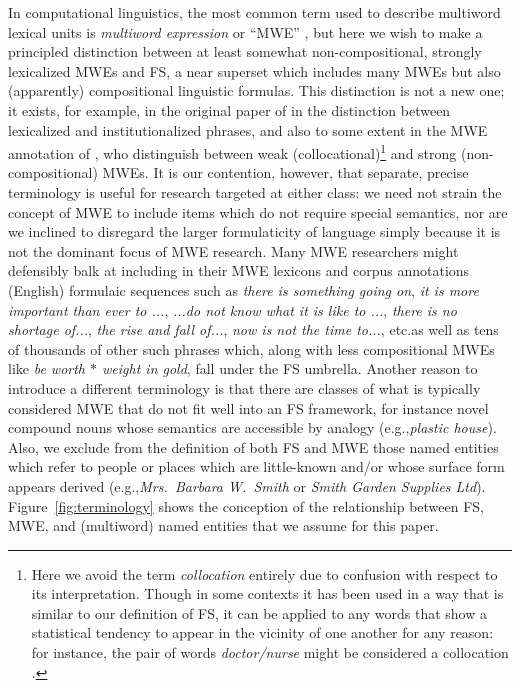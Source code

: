 \documentclass[11pt,letterpaper]{article}
\makeatletter
\def \eg {e.g.,\@ }
\def \etc {etc.\@ }
\newcommand{\dotts}{...}
\newcommand{\gap}{$*$\xspace}
\newcommand{\ex}[1]{\textit{#1}\xspace}
\newcommand{\figref}[2][]{Figure#1~\ref{#2}\xspace}
\makeatother
\begin{document}
In computational linguistics, the most common term used to describe multiword lexical units is \emph{multiword expression} or ``MWE'' \cite{Sag02,Baldwin10}, but here we wish to make a principled distinction between at least somewhat non-compositional, strongly lexicalized MWEs and FS, a near superset which includes many MWEs but also (apparently) compositional linguistic formulas. This distinction is not a new one; it exists, for example, in the original paper of  in the distinction between lexicalized and institutionalized phrases, and also to some extent in the MWE annotation of , who distinguish between weak (collocational)\footnote{Here we avoid the term \emph{collocation} entirely due to confusion with respect to its interpretation. Though in some contexts it has been used in a way that is similar to our definition of FS, it can be applied to any words that show a statistical tendency to appear in the vicinity of one another for any reason: for instance, the pair of words \ex{doctor/nurse} might be considered a collocation \cite{Ramisch14}.}  and strong (non-compositional) MWEs. It is our contention, however, that separate, precise terminology is useful for research targeted at either class: we need not strain the concept of MWE to include items which do not require special semantics, nor are we inclined to disregard the larger formulaticity of language simply because it is not the dominant focus of MWE research. Many MWE researchers might defensibly balk at including in their MWE lexicons and corpus annotations (English) formulaic sequences such as \ex{there is something going on}, \ex{it is more important than ever to \dotts}, \ex{\dotts do not know what it is like to \dotts}, \ex{there is no shortage of\dotts}, \ex{the rise and fall of\dotts}, \ex{now is not the time to\dotts}, \etc as well as tens of thousands of other such phrases which, along with less compositional MWEs like \ex{be worth \gap weight in gold}, fall under the FS umbrella. Another reason to introduce a different terminology is that there are classes of what is typically considered MWE that do not fit well into an FS framework, for instance novel compound nouns whose semantics are accessible by analogy (\eg \ex{plastic house}). Also, we exclude from the definition of both FS and MWE those named entities which refer to people or places which are little-known and/or whose surface form appears derived (\eg \ex{Mrs.\ Barbara W.\ Smith} or \ex{Smith Garden Supplies Ltd}). \figref{fig:terminology} shows the conception of the relationship between FS, MWE, and (multiword) named entities that we assume for this paper.
\end{document}
